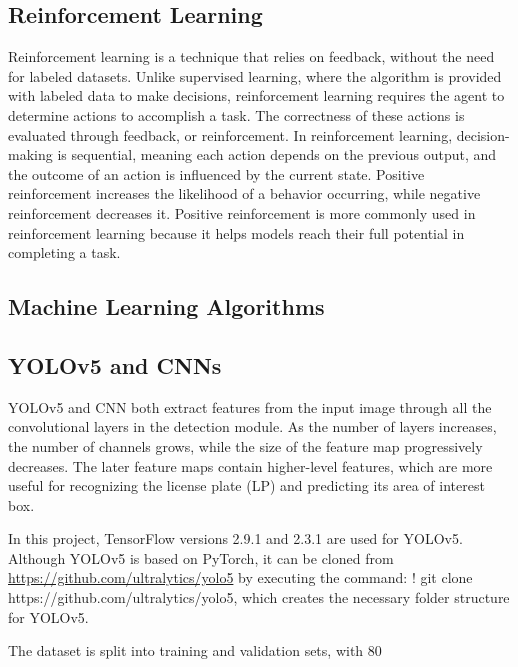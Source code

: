 \subsection{Reinforcement Learning}
Reinforcement learning is a technique that relies on feedback, without the need for labeled datasets. Unlike supervised learning, where the algorithm is provided with labeled data to make decisions, reinforcement learning requires the agent to determine actions to accomplish a task. The correctness of these actions is evaluated through feedback, or reinforcement. In reinforcement learning, decision-making is sequential, meaning each action depends on the previous output, and the outcome of an action is influenced by the current state. Positive reinforcement increases the likelihood of a behavior occurring, while negative reinforcement decreases it. Positive reinforcement is more commonly used in reinforcement learning because it helps models reach their full potential in completing a task.

\subsection{Machine Learning Algorithms}

\subsection{YOLOv5 and CNNs}
YOLOv5 and CNN both extract features from the input image through all the convolutional layers in the detection module. As the number of layers increases, the number of channels grows, while the size of the feature map progressively decreases. \cite{Redmon:2016} The later feature maps contain higher-level features, which are more useful for recognizing the license plate (LP) and predicting its area of interest box.

In this project, TensorFlow versions 2.9.1 and 2.3.1 are used for YOLOv5. Although YOLOv5 is based on PyTorch, it can be cloned from \url{https://github.com/ultralytics/yolo5} by executing the command: ! git clone https://github.com/ultralytics/yolo5, which creates the necessary folder structure for YOLOv5.

The dataset is split into training and validation sets, with 80%

